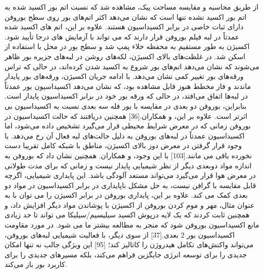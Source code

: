 از طریق محاسبه و مقایسه مساحت پیک، مشاهده شد که نسبت اتم بور اکسید شده به اتم بور اکسید نشده تنها  است که نشان می‌دهد اکثر اتم‌های بور روی سطح بوروفن دارای ثبات خاصی در برابر اکسیداسیون هستند. علاوه بر این، اتم های اکسید شده عمدتاً در لبه فیلم بوروفن قرار دارند که می تواند با آزمایش های  درجا تأیید شود. اکسیژن به طور مستقیم به محفظه خلاء پمپ شد و سطح بور در محل با استفاده از  اسکن شد. در غلظت‌های بالای اکسیژن، لکه‌های روشن در لبه‌های جزیره بور ظاهر می‌شوند که نشان می‌دهد اتم‌های بور شروع به اکسید شدن کرده‌اند، در حالی که تراس ورقه‌های بور تغییر کمی نشان می‌دهد. با ادامه جریان اکسیژن، ورقه‌های بور پایدار ماندند و فاز مخطط هنوز قابل مشاهده بود، که نشان می‌دهد اکسیداسیون بور عمدتاً در لبه‌ها اتفاق می‌افتد، در حالی که ورقه بور خود در برابر اکسیداسیون پایدار است. بنابراین، بوروفن دو بعدی در مقایسه با بور فله سه بعدی نسبت به اکسیداسیون بی اثرتر است. علاوه بر این،  و همکاران.[36] همچنین دریافتند که حالت اکسیداسیون در بوروفن زمانی که در معرض شرایط محیطی قرار می‌گیرد تشخیص داده می‌شود، اما اکسیداسیون عمدتاً در لبه‌های بوروفن به دلیل حالت‌های لبه فعال آن رخ می‌دهد. با وجود قرار گرفتن در معرض دوز بالای اکسیژن، مناطق با شبکه کامل تقریبا دست نخورده باقی می مانند.[103] با این وجود،  و همکاران. همچنین نشان داد که بوروفن به اندازه مواد دوبعدی دیگر از نظر شیمیایی پایدار نیست و زمانی که برای مدت طولانی در معرض هوا قرار می‌گیرد می‌تواند مستعد آلودگی باشد. این پایداری شیمیایی، اگرچه قابل مقایسه با گرافن نیست، به حل مشکل ناپایداری در برابر اکسیداسیون در مواد دو بعدی کمک می کند. علاوه بر این، پایداری بوروفن در برابر اکسیژن را می توان با به عنوان مثال، مهر و موم کردن بوروفن از اکسیژن با پوشاندن مواد دیگر افزایش داد، و همچنین ثابت کردند که یک لایه درپوش اکسید سیلیسیم/سیلیکا می تواند تا حد زیادی مانع اکسیداسیون بوروفن شود که منجر به مطالعه بیشتر ما می شود. در مورد مقاومت اکسیداسیون بور 2 بعدی.[37] از سوی دیگر، با فعالیت شیمیایی لبه‌های بوروفن، می‌تواند واکنش‌های تکامل هیدروژن را کاتالیز کند؛ [95] این ویژگی جالب نه تنها امکان جدیدی را برای توسعه انرژی جایگزین فراهم می‌کند، بلکه مسیرهای جدیدی را برای کاربرد بور باز می‌کند.

